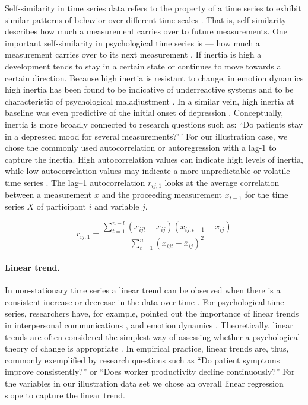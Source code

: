 Self-similarity in time series data refers to the property of a time
series to exhibit similar patterns of behavior over different time
scales \citep{dmello2021}. That is, self-similarity describes how much a
measurement carries over to future measurements. One important
self-similarity in psychological time series is  --- how
much a measurement carries over to its next measurement
\citep{kuppens2010}. If inertia is high a development tends to stay in a
certain state or continues to move towards a certain direction. Because
high inertia is resistant to change, in emotion dynamics high inertia
has been found to be indicative of underreactive systems and to be
characteristic of psychological maladjustment \citep{kuppens2010}. In a
similar vein, high inertia at baseline was even predictive of the
initial onset of depression \citep{kuppens2012}. Conceptually, inertia
is more broadly connected to research questions such as: ``Do patients
stay in a depressed mood for several measurements?'\,' For our
illustration case, we chose the commonly used autocorrelation or
autoregression with a lag-1 to capture the inertia. High autocorrelation
values can indicate high levels of inertia, while low autocorrelation
values may indicate a more unpredictable or volatile time series
\citep{dejonckheere2019}. The lag--1 autocorrelation \(r_{ij,1}\) looks
at the average correlation between a measurement \(x\) and the
proceeding measurement \(x_{t-1}\) for the time series \(X\) of
participant \(i\) and variable \(j\).

\begin{equation} \label{eq:ar}
  r_{ij,1} = \frac{\sum_{t=1}^{n-l}(x_{ijt}-\overline{x}_{ij})(x_{ij,t-1}-\overline{x}_{ij})}{\sum_{t=1}^{n}(x_{ijt}-\overline{x}_{ij})^2}
\end{equation}

\paragraph{Linear trend.}

In non-stationary time series a linear trend can be observed when there
is a consistent increase or decrease in the data over time
\citep{nyblom1986}. For psychological time series, researchers have, for
example, pointed out the importance of linear trends in interpersonal
communications \citep{vasileiadou2014}, and emotion dynamics
\citep{oravecz2016}. Theoretically, linear trends are often considered
the simplest way of assessing whether a psychological theory of change
is appropriate \citep{gottman1969}. In empirical practice, linear trends
are, thus, commonly exemplified by research questions such as ``Do
patient symptoms improve consistently?'' or ``Does worker productivity
decline continuously?'' For the variables in our illustration data set
we chose an overall linear regression slope to capture the linear trend.

